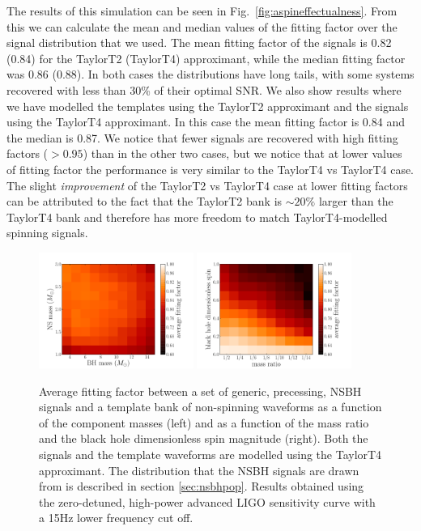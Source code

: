The results of this simulation can be seen in 
Fig.~\ref{fig:aspineffectualness}. From this we can calculate the mean and 
median values of the fitting factor over the signal distribution that we used.
The mean fitting factor of the
signals is 0.82 (0.84) for the TaylorT2 (TaylorT4) approximant, while the median
fitting factor was 0.86 (0.88). In both cases the distributions have 
long tails, with some systems recovered with less than 30\% of their optimal
\ac{SNR}.
We also show results where we have modelled the templates using the TaylorT2
approximant and the signals using the TaylorT4 approximant. In this case
the mean fitting factor is 0.84 and the median is 0.87.
We notice that fewer signals are recovered with
high fitting factors ($> 0.95$) than in the other two cases, but we notice that
at lower values of fitting
factor the performance is very similar to the TaylorT4 vs TaylorT4 case.
The slight \emph{improvement}
of the TaylorT2 vs TaylorT4 case at lower fitting factors can be attributed to
the fact that the TaylorT2 bank is $\sim20\%$
larger than the TaylorT4 bank and therefore has more freedom to match
TaylorT4-modelled spinning signals. 

\begin{figure}
    \centering
    \begin{minipage}[l]{2.0\columnwidth}
    \centering
\includegraphics[width=0.45\textwidth]
{papers/nsbh_effectualness/figure8A.pdf}
\includegraphics[width=0.45\textwidth]
{papers/nsbh_effectualness/figure8B.pdf}
\caption{\label{fig:nonspinavFF}
Average fitting factor between a set of generic, precessing, NSBH signals and a
template bank of non-spinning waveforms as a function of the component masses
(left) and as a function of the mass ratio and the black hole dimensionless spin
magnitude (right). Both the signals and the template waveforms are modelled
using the TaylorT4 approximant. The distribution that the NSBH
signals are drawn from is described in section \ref{sec:nsbhpop}.
Results obtained
using the zero-detuned, high-power advanced LIGO sensitivity curve with a 15Hz
lower frequency cut off.
}
\end{minipage}
\end{figure}


